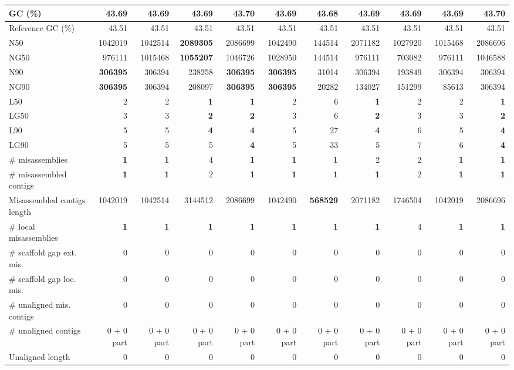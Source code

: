 \documentclass[12pt,a4paper]{article}
\begin{document}
\begin{table}[ht]
\begin{center}
\begin{tabular}{|l*{10}{|r}|}
GC (\%) & 43.69 & 43.69 & 43.69 & 43.70 & 43.69 & 43.68 & 43.69 & 43.69 & 43.69 & 43.70 \\ \hline
Reference GC (\%) & 43.51 & 43.51 & 43.51 & 43.51 & 43.51 & 43.51 & 43.51 & 43.51 & 43.51 & 43.51 \\ \hline
N50 & 1042019 & 1042514 & {\bf 2089305} & 2086699 & 1042490 & 144514 & 2071182 & 1027920 & 1015468 & 2086696 \\ \hline
NG50 & 976111 & 1015468 & {\bf 1055207} & 1046726 & 1028950 & 144514 & 976111 & 703082 & 976111 & 1046588 \\ \hline
N90 & {\bf 306395} & 306394 & 238258 & {\bf 306395} & {\bf 306395} & 31014 & 306394 & 193849 & 306394 & 306394 \\ \hline
NG90 & {\bf 306395} & 306394 & 208097 & {\bf 306395} & {\bf 306395} & 20282 & 134027 & 151299 & 85613 & 306394 \\ \hline
L50 & 2 & 2 & {\bf 1} & {\bf 1} & 2 & 6 & {\bf 1} & 2 & 2 & {\bf 1} \\ \hline
LG50 & 3 & 3 & {\bf 2} & {\bf 2} & 3 & 6 & {\bf 2} & 3 & 3 & {\bf 2} \\ \hline
L90 & 5 & 5 & {\bf 4} & {\bf 4} & 5 & 27 & {\bf 4} & 6 & 5 & {\bf 4} \\ \hline
LG90 & 5 & 5 & 5 & {\bf 4} & 5 & 33 & 5 & 7 & 6 & {\bf 4} \\ \hline
\# misassemblies & {\bf 1} & {\bf 1} & 4 & {\bf 1} & {\bf 1} & {\bf 1} & 2 & 2 & {\bf 1} & {\bf 1} \\ \hline
\# misassembled contigs & {\bf 1} & {\bf 1} & 2 & {\bf 1} & {\bf 1} & {\bf 1} & {\bf 1} & 2 & {\bf 1} & {\bf 1} \\ \hline
Misassembled contigs length & 1042019 & 1042514 & 3144512 & 2086699 & 1042490 & {\bf 568529} & 2071182 & 1746504 & 1042019 & 2086696 \\ \hline
\# local misassemblies & {\bf 1} & {\bf 1} & {\bf 1} & {\bf 1} & {\bf 1} & {\bf 1} & {\bf 1} & 4 & {\bf 1} & {\bf 1} \\ \hline
\# scaffold gap ext. mis. & 0 & 0 & 0 & 0 & 0 & 0 & 0 & 0 & 0 & 0 \\ \hline
\# scaffold gap loc. mis. & 0 & 0 & 0 & 0 & 0 & 0 & 0 & 0 & 0 & 0 \\ \hline
\# unaligned mis. contigs & 0 & 0 & 0 & 0 & 0 & 0 & 0 & 0 & 0 & 0 \\ \hline
\# unaligned contigs & 0 + 0 part & 0 + 0 part & 0 + 0 part & 0 + 0 part & 0 + 0 part & 0 + 0 part & 0 + 0 part & 0 + 0 part & 0 + 0 part & 0 + 0 part \\ \hline
Unaligned length & 0 & 0 & 0 & 0 & 0 & 0 & 0 & 0 & 0 & 0 \\ \hline

\end{tabular}
\end{center}
\end{table}
\end{document}
